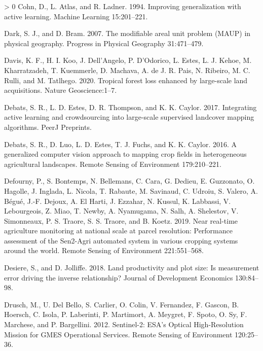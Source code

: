 \documentclass[11pt,a4paper]{article}
\newlength{\cslhangindent}
\newenvironment{CSLReferences}[3] %
 {%
  \setlength{\parindent}{0pt}
  \ifodd #1 \everypar{\setlength{\hangindent}{\cslhangindent}}\ignorespaces\fi
  \ifnum #2 > 0
  \setlength{\parskip}{#2\baselineskip}
  \fi
 }%
 {}
\begin{document}
\begin{CSLReferences}{1}{0}
\leavevmode\hypertarget{ref-cohnImprovingGeneralizationActive1994}{}%
Cohn, D., L. Atlas, and R. Ladner. 1994. Improving generalization with
active learning. Machine Learning 15:201--221.

\leavevmode\hypertarget{ref-Darkmodifiablearealunit2007}{}%
Dark, S. J., and D. Bram. 2007. The modifiable areal unit problem
({MAUP}) in physical geography. Progress in Physical Geography
31:471--479.

\leavevmode\hypertarget{ref-davisTropicalForestLoss2020}{}%
Davis, K. F., H. I. Koo, J. Dell'Angelo, P. D'Odorico, L. Estes, L. J.
Kehoe, M. Kharratzadeh, T. Kuemmerle, D. Machava, A. de J. R. Pais, N.
Ribeiro, M. C. Rulli, and M. Tatlhego. 2020. Tropical forest loss
enhanced by large-scale land acquisitions. Nature Geoscience:1--7.

\leavevmode\hypertarget{ref-DebatsIntegratingactivelearning2017}{}%
Debats, S. R., L. D. Estes, D. R. Thompson, and K. K. Caylor. 2017.
Integrating active learning and crowdsourcing into large-scale
supervised landcover mapping algorithms. {PeerJ Preprints}.

\leavevmode\hypertarget{ref-Debatsgeneralizedcomputervision2016}{}%
Debats, S. R., D. Luo, L. D. Estes, T. J. Fuchs, and K. K. Caylor. 2016.
A generalized computer vision approach to mapping crop fields in
heterogeneous agricultural landscapes. Remote Sensing of Environment
179:210--221.

\leavevmode\hypertarget{ref-Defournyrealtimeagriculturemonitoring2019}{}%
Defourny, P., S. Bontemps, N. Bellemans, C. Cara, G. Dedieu, E.
Guzzonato, O. Hagolle, J. Inglada, L. Nicola, T. Rabaute, M. Savinaud,
C. Udroiu, S. Valero, A. Bégué, J.-F. Dejoux, A. El Harti, J. Ezzahar,
N. Kussul, K. Labbassi, V. Lebourgeois, Z. Miao, T. Newby, A. Nyamugama,
N. Salh, A. Shelestov, V. Simonneaux, P. S. Traore, S. S. Traore, and B.
Koetz. 2019. Near real-time agriculture monitoring at national scale at
parcel resolution: Performance assessment of the {Sen2}-{Agri} automated
system in various cropping systems around the world. Remote Sensing of
Environment 221:551--568.

\leavevmode\hypertarget{ref-desiereLandProductivityPlot2018}{}%
Desiere, S., and D. Jolliffe. 2018. Land productivity and plot size: Is
measurement error driving the inverse relationship? Journal of
Development Economics 130:84--98.

\leavevmode\hypertarget{ref-DruschSentinel2ESAOptical2012}{}%
Drusch, M., U. Del Bello, S. Carlier, O. Colin, V. Fernandez, F. Gascon,
B. Hoersch, C. Isola, P. Laberinti, P. Martimort, A. Meygret, F. Spoto,
O. Sy, F. Marchese, and P. Bargellini. 2012. Sentinel-2: {ESA}'s
{Optical High}-{Resolution Mission} for {GMES Operational Services}.
Remote Sensing of Environment 120:25--36.


\end{CSLReferences}
\end{document}
